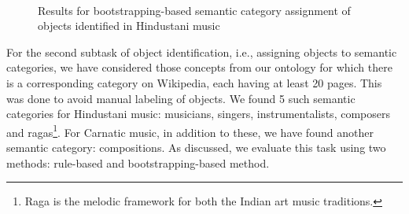 \documentclass{llncs}
\begin{document}
\begin{figure}[!h]
\begin{center}
{		 \label{fig:qual-object-bootstrapping-hindustani-instrumentalists}
        }%
        \qquad
        \\
\end{center}
\caption{Results for bootstrapping-based semantic category assignment of objects identified in Hindustani music}
\end{figure}

For the second subtask of object identification, i.e., assigning objects to semantic categories, we have considered those concepts from our ontology for which there is a corresponding category on Wikipedia, each having at least 20 pages. This was done to avoid manual labeling of objects. We found 5 such semantic categories for Hindustani music: musicians, singers, instrumentalists, composers and ragas\footnote{Raga is the melodic framework for both the Indian art music traditions.}. For Carnatic music, in addition to these, we have found another semantic category: compositions. As discussed, we evaluate this task using two methods: rule-based and bootstrapping-based method.
\end{document}
